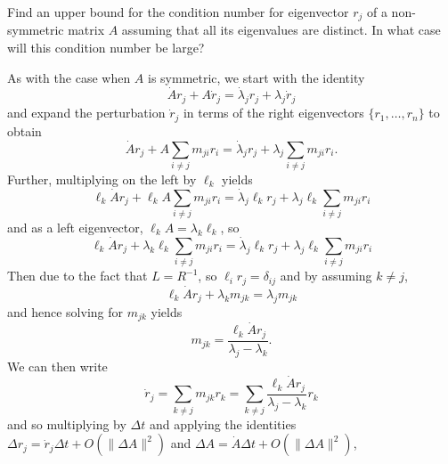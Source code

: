 \documentclass{../../../kin_math}
\begin{document}
\begin{questions}
  \question Find an upper bound for the condition number for eigenvector $r_j$ of a non-symmetric matrix $A$ assuming that all its eigenvalues are distinct. In what case will this condition number be large?
  \begin{solution}
    As with the case when $A$ is symmetric, we start with the identity
    \begin{equation*}
      \dot{A}r_j + A\dot{r}_j = \dot{\lambda}_jr_j + \lambda_j\dot{r}_j
    \end{equation*}
    and expand the perturbation $\dot{r}_j$ in terms of the right eigenvectors $\{r_1, \dots, r_n\}$ to obtain
    \begin{equation*}
      \dot{A}r_j + A \sum_{i \neq j} m_{ji} r_i = \dot{\lambda}_jr_j + \lambda_j \sum_{i \neq j} m_{ji} r_i.
    \end{equation*}
    Further, multiplying on the left by $\ell_k$ yields
    \begin{equation*}
      \ell_k \dot{A}r_j + \ell_k A \sum_{i \neq j} m_{ji} r_i = \dot{\lambda}_j \ell_k r_j + \lambda_j \ell_k \sum_{i \neq j} m_{ji} r_i
    \end{equation*}
    and as a left eigenvector, $\ell_k A = \lambda_k \ell_k$, so
    \begin{equation*}
      \ell_k \dot{A}r_j + \lambda_k \ell_k \sum_{i \neq j} m_{ji} r_i = \dot{\lambda}_j \ell_k r_j + \lambda_j \ell_k \sum_{i \neq j} m_{ji} r_i
    \end{equation*}
    Then due to the fact that $L = R^{-1}$, so $\ell_i r_j = \delta_{ij}$ and by assuming $k \neq j$,
    \begin{equation*}
      \ell_k \dot{A}r_j + \lambda_k m_{jk} = \lambda_j m_{jk}
    \end{equation*}
    and hence solving for $m_{jk}$ yields
    \begin{equation*}
      m_{jk} = \frac{\ell_k \dot{A}r_j}{\lambda_j - \lambda_k}.
    \end{equation*}
    We can then write
    \begin{equation*}
      \dot{r}_j = \sum_{k \neq j} m_{jk} r_k = \sum_{k \neq j} \frac{\ell_k \dot{A}r_j}{\lambda_j - \lambda_k} r_k
    \end{equation*}
    and so multiplying by $\Delta t$ and applying the identities $\Delta r_j = \dot{r}_j \Delta t + O(\lVert \Delta A \rVert^2)$ and $\Delta A = \dot{A} \Delta t + O(\lVert \Delta A \rVert^2)$,
    \begin{equation*}

\end{equation*}
\end{solution}
\end{questions}
\end{document}
